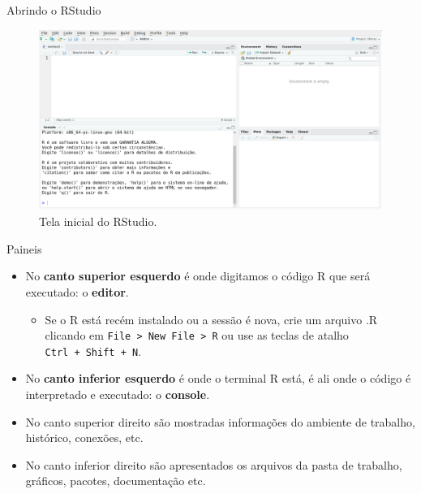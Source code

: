 \documentclass[
  ignorenonframetext,
  serif,
  professionalfont,
  usenames,
  dvipsnames,
  aspectratio = 169]{beamer}
\providecommand{\tightlist}{%
  \setlength{\itemsep}{0pt}\setlength{\parskip}{0pt}}
\renewcommand{\tightlist}{%
  \setlength{\itemsep}{0\baselineskip}
  \setlength{\parskip}{0.25\baselineskip}
}
\begin{document}
\begin{frame}{Abrindo o RStudio}
\protect\hypertarget{abrindo-o-rstudio-2}{}
\begin{figure}

{\centering \includegraphics[width=0.85\linewidth]{./img/rstudio} 

}

\caption{Tela inicial do RStudio.}\label{fig:unnamed-chunk-4}
\end{figure}
\end{frame}

\begin{frame}[fragile]{Paineis}
\protect\hypertarget{paineis}{}
\begin{itemize}
\item
  No \textbf{canto superior esquerdo} é onde digitamos o código R que
  será executado: o \textbf{editor}.

  \begin{itemize}
  \tightlist
  \item
    Se o R está recém instalado ou a sessão é nova, crie um arquivo .R
    clicando em
    \texttt{File\ \textgreater{}\ New\ File\ \textgreater{}\ R} ou use
    as teclas de atalho \texttt{Ctrl\ +\ Shift\ +\ N}.
  \end{itemize}
\item
  No \textbf{canto inferior esquerdo} é onde o terminal R está, é ali
  onde o código é interpretado e executado: o \textbf{console}.
\item
  No canto superior direito são mostradas informações do ambiente de
  trabalho, histórico, conexões, etc.
\item
  No canto inferior direito são apresentados os arquivos da pasta de
  trabalho, gráficos, pacotes, documentação etc.
\end{itemize}
\end{frame}
\end{document}
